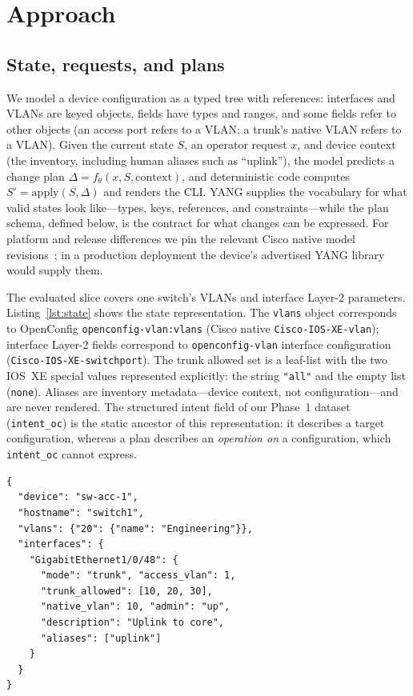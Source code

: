 \documentclass[conference]{IEEEtran}
\begin{document}
\section{Approach}
\label{sec:approach}

\subsection{State, requests, and plans}

We model a device configuration as a typed tree with references: interfaces and VLANs are keyed objects, fields have types and ranges, and some fields refer to other objects (an access port refers to a VLAN; a trunk's native VLAN refers to a VLAN). Given the current state $S$, an operator request $x$, and device context (the inventory, including human aliases such as ``uplink''), the model predicts a change plan $\Delta = f_\theta(x, S, \mathrm{context})$, and deterministic code computes $S' = \mathrm{apply}(S, \Delta)$ and renders the CLI. YANG supplies the vocabulary for what valid states look like---types, keys, references, and constraints---while the plan schema, defined below, is the contract for what changes can be expressed. For platform and release differences we pin the relevant Cisco native model revisions~\cite{yangmodels}; in a production deployment the device's advertised YANG library~\cite{rfc8525} would supply them.

The evaluated slice covers one switch's VLANs and interface Layer-2 parameters. Listing~\ref{lst:state} shows the state representation. The \texttt{vlans} object corresponds to OpenConfig \texttt{openconfig-vlan:vlans} (Cisco native \texttt{Cisco-IOS-XE-vlan}); interface Layer-2 fields correspond to \texttt{openconfig-vlan} interface configuration (\texttt{Cisco-IOS-XE-switchport}). The trunk allowed set is a leaf-list with the two IOS~XE special values represented explicitly: the string \texttt{"all"} and the empty list (\texttt{none}). Aliases are inventory metadata---device context, not configuration---and are never rendered. The structured intent field of our Phase~1 dataset (\texttt{intent\_oc}) is the static ancestor of this representation: it describes a target configuration, whereas a plan describes an \emph{operation on} a configuration, which \texttt{intent\_oc} cannot express.

\begin{lstlisting}[caption={Device state for the evaluated slice (abridged).}, label={lst:state}]
{
  "device": "sw-acc-1",
  "hostname": "switch1",
  "vlans": {"20": {"name": "Engineering"}},
  "interfaces": {
    "GigabitEthernet1/0/48": {
      "mode": "trunk", "access_vlan": 1,
      "trunk_allowed": [10, 20, 30],
      "native_vlan": 10, "admin": "up",
      "description": "Uplink to core",
      "aliases": ["uplink"]
    }
  }
}
\end{lstlisting}
\end{document}
